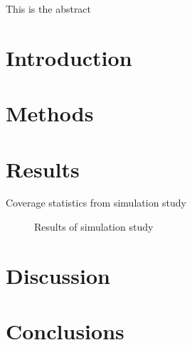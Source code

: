 
\usepackage{booktabs}

This is the abstract

\section*{Introduction}

\section*{Methods}

\section*{Results}

\begin{table}
    \centering
    \caption{Coverage statistics from simulation study}
    \label{tab:coverage}
\end{table}


\begin{figure}
    \centering
    \caption{Results of simulation study}
    \label{fig:coverage}
\end{figure}

\section*{Discussion}

\section*{Conclusions}

